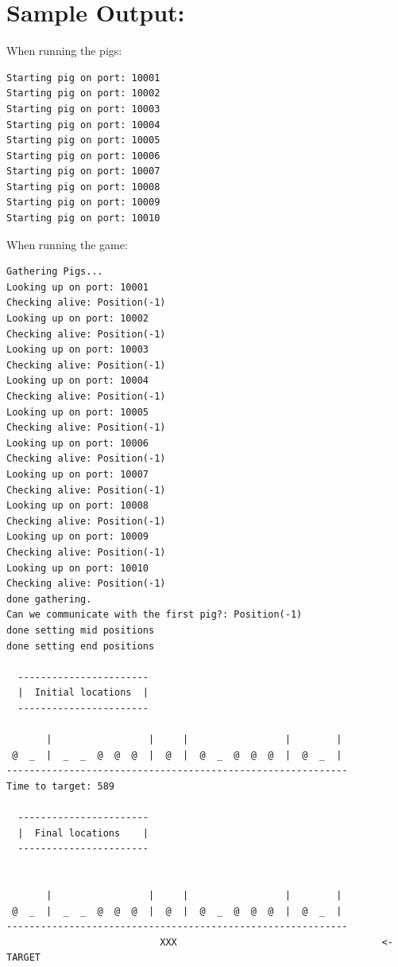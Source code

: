 \documentclass[]{article}
\begin{document}
\section{Sample Output:}

When running the pigs:

\begin{verbatim}
Starting pig on port: 10001
Starting pig on port: 10002
Starting pig on port: 10003
Starting pig on port: 10004
Starting pig on port: 10005
Starting pig on port: 10006
Starting pig on port: 10007
Starting pig on port: 10008
Starting pig on port: 10009
Starting pig on port: 10010
\end{verbatim}

When running the game:

\begin{verbatim}
Gathering Pigs...
Looking up on port: 10001
Checking alive: Position(-1)
Looking up on port: 10002
Checking alive: Position(-1)
Looking up on port: 10003
Checking alive: Position(-1)
Looking up on port: 10004
Checking alive: Position(-1)
Looking up on port: 10005
Checking alive: Position(-1)
Looking up on port: 10006
Checking alive: Position(-1)
Looking up on port: 10007
Checking alive: Position(-1)
Looking up on port: 10008
Checking alive: Position(-1)
Looking up on port: 10009
Checking alive: Position(-1)
Looking up on port: 10010
Checking alive: Position(-1)
done gathering.
Can we communicate with the first pig?: Position(-1)
done setting mid positions
done setting end positions

  -----------------------
  |  Initial locations  |
  -----------------------

       |                 |     |                 |        | 
 @  _  |  _  _  @  @  @  |  @  |  @  _  @  @  @  |  @  _  | 
------------------------------------------------------------
Time to target: 589

  -----------------------
  |  Final locations    |
  -----------------------


       |                 |     |                 |        | 
 @  _  |  _  _  @  @  @  |  @  |  @  _  @  @  @  |  @  _  | 
------------------------------------------------------------
                           XXX                                    <- TARGET
\end{verbatim}
\end{document}
